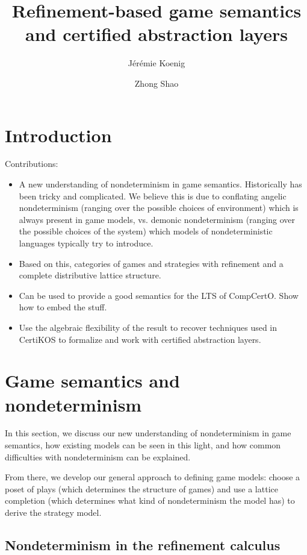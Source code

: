 \documentclass[format=sigplan,authordraft]{acmart}
\title{Refinement-based game semantics and certified abstraction layers} %
\author{J\'er\'emie Koenig}
\affiliation{Yale University}
\author{Zhong Shao}
\affiliation{Yale University}
\begin{document}
\maketitle

\section{Introduction} %

Contributions:
\begin{itemize}
\item A new understanding of nondeterminism in game semantics.
  Historically has been tricky and complicated.
  We believe this is due to conflating
  angelic nondeterminism
  (ranging over the possible choices of environment)
  which is always present in game models,
  vs. demonic nondeterminism
  (ranging over the possible choices of the system)
  which models of nondeterministic languages
  typically try to introduce.
\item Based on this,
  categories of games and strategies
  with refinement and a complete distributive lattice structure.
\item Can be used to provide a good semantics
  for the LTS of CompCertO.
  Show how to embed the stuff.
\item Use the algebraic flexibility of the result
  to recover techniques used in CertiKOS
  to formalize and work with
  certified abstraction layers.
\end{itemize}


\section{Game semantics and nondeterminism} %

In this section,
we discuss our new understanding of
nondeterminism in game semantics,
how existing models can be seen in this light,
and how common difficulties
with nondeterminism can be explained.

From there,
we develop our general approach
to defining game models:
choose a poset of plays
(which determines the structure of games)
and use a lattice completion
(which determines what kind of nondeterminism
the model has)
to derive the strategy model.

\subsection{Nondeterminism in the refinement calculus} \label{sec:refcal} %
\end{document}
